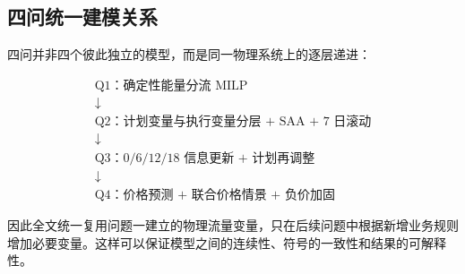 \subsection{四问统一建模关系}

四问并非四个彼此独立的模型，而是同一物理系统上的逐层递进：

\[
\boxed{
\begin{array}{c}
\text{Q1：确定性能量分流 MILP}\\
\downarrow\\
\text{Q2：计划变量与执行变量分层 + SAA + 7 日滚动}\\
\downarrow\\
\text{Q3：0/6/12/18 信息更新 + 计划再调整}\\
\downarrow\\
\text{Q4：价格预测 + 联合价格情景 + 负价加固}
\end{array}
}
\]

因此全文统一复用问题一建立的物理流量变量，只在后续问题中根据新增业务规则增加必要变量。这样可以保证模型之间的连续性、符号的一致性和结果的可解释性。
